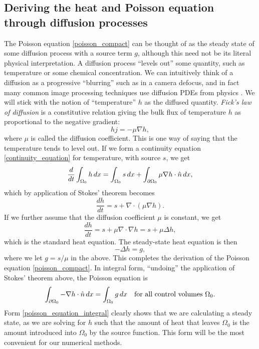 \subsection{Deriving the heat and Poisson equation through diffusion processes}
The Poisson equation \eqref{poisson_compact} can be thought of as the steady state of some diffusion process with a source term $g$,
although this need not be its literal physical interpretation.
A diffusion process ``levels out'' some quantity, such as temperature or some chemical concentration. We can intuitively think of a diffusion as a
progressive ``blurring''
such as in a camera defocus, and in fact many common image processing techniques use diffusion PDEs from physics \cite{tum}. We will stick with
the notion of ``temperature'' $h$ as the diffused quantity.
\textit{Fick's law of diffusion} is a constitutive relation giving the bulk flux of temperature $h$ as proportional to the negative gradient:
    $$hj = -\mu\nabla h,$$
where $\mu$ is called the diffusion coefficient.
This is one way of saying that the temperature tends to level out.
If we form a continuity equation \eqref{continuity_equation} for temperature, with source $s$, we get
\begin{equation}\label{heat_equation_integral}
    \frac{d}{dt} \int_{\Omega_0} h\,dx = \int_{\Omega_0} s\,dx + \int_{{\partial\Omega_0}} \mu \nabla h \cdot \hat{n}\,dx,
\end{equation}
which by application of Stokes' theorem becomes
\begin{equation}\label{heat_equation_differential}
    \frac{dh}{dt} = s + \nabla \cdot \left(\mu \nabla h\right).
\end{equation}
If we further assume that the diffusion coefficient $\mu$ is constant, we get
\begin{equation}\label{heat_equation_differential_constant}
    \frac{dh}{dt} = s + \mu\nabla \cdot \nabla h = s + \mu\Delta h,
\end{equation}
which is the standard heat equation.
The steady-state heat equation is then
\begin{equation}\label{poisson_equation}
    -\Delta h = g,
\end{equation}
where we let $g = s/\mu$ in the above.
This completes the derivation of the Poisson equation \eqref{poisson_compact}.
In integral form, ``undoing'' the application of Stokes' theorem above, the Poisson equation is
\begin{equation}\label{poisson_equation_integral}
    \int_{{\partial\Omega_0}} -\nabla h\cdot \hat{n}\,dx = \int_{{\Omega_0}} g\,dx \quad \text{for all control volumes $\Omega_0$.}
\end{equation}
Form \eqref{poisson_equation_integral} clearly shows that we are calculating a steady state,
as we are solving for $h$ such that the amount of heat that leaves $\Omega_0$ is the amount introduced into $\Omega_0$ by the source function.
This form will be the most convenient for our numerical methods.

